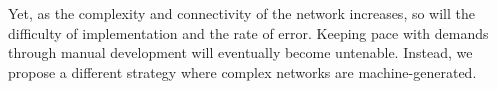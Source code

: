 Yet, as the complexity and connectivity of the network increases, so
will the difficulty of implementation and the rate of error.  Keeping
pace with demands through manual development will eventually become
untenable.  Instead, we propose a different strategy where complex
networks are machine-generated.

